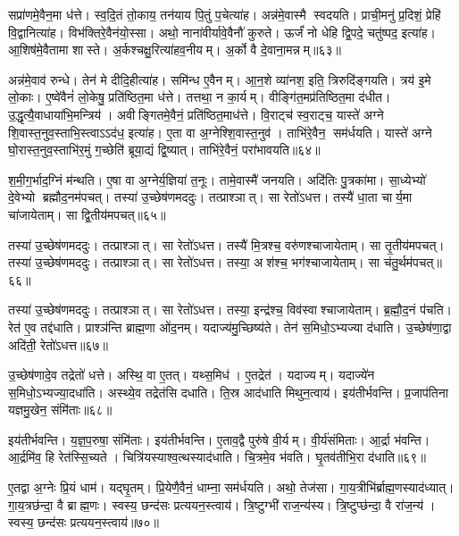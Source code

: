 सप्रा॑णमे॒वैन॒मा ध॑त्ते। स्व॒दि॒तं तो॒काय॒ तन॑याय पि॒तुं प॒चेत्या॑ह। अन्न॑मे॒वास्मै स्वदयति। प्राची॒मनु॑ प्र॒दिशं॒ प्रेहि॑ वि॒द्वानित्या॑ह। विभ॑क्तिरे॒वैन॑यो॒स्सा। अथो॒ नाना॑वीर्यावे॒वैनौ॑ कुरुते। ऊर्जं॑ नो धेहि द्वि॒पदे॒ चतु॑ष्पद॒ इत्या॑ह। आ॒शिष॑मे॒वैतामा शास्ते। अ॒र्कश्चक्षु॒रित्या॑हव॒नीयम्। अ॒र्को वै दे॒वाना॒मन्नम्॥६३॥

अन्न॑मे॒वाव॑ रुन्धे। तेन॑ मे दीदि॒हीत्या॑ह। समि॑न्ध ए॒वैनम्। आ॒न॒शे व्या॑नश॒ इति॒ त्रिरुदि॑ङ्गयति। त्रय॑ इ॒मे लो॒काः। ए॒ष्वे॑वैनं॑ लो॒केषु॒ प्रति॑ष्ठित॒मा ध॑त्ते। तत्तथा॒ न का॒र्यम्। वीङ्गि॑त॒मप्र॑तिष्ठित॒मा द॑धीत। उ॒द्धृत्यै॒वाधाया॑भि॒मन्त्रिय॑। अवीङ्गितमे॒वैनं॒ प्रति॑ष्ठित॒माध॑त्ते। वि॒राट्च॑ स्व॒राट्च॒ यास्ते॑ अग्ने शि॒वास्त॒नुव॒स्ताभि॒स्त्वाऽऽद॑ध॒ इत्या॑ह। ए॒ता वा अ॒ग्नेश्शि॒वास्त॒नुव॑। ताभि॑रे॒वैन॒ सम॑र्धयति। यास्ते॑ अग्ने घो॒रास्त॒नुव॒स्ताभि॑र॒मुं ग॒च्छेति॑ ब्रूया॒द्यं द्वि॒ष्यात्। ताभि॑रे॒वैनं॒ परा॑भावयति॥६४॥\anuvakamend[लो॒को॑ऽसृजतैन॒माध॑त्तेऽन्वाहार्य॒पच॑नं दे॒वाना॒मन्न॑मेनं॒ प्रति॑ष्ठित॒माध॑त्ते॒ पञ्च॑ च]

श॒मी॒ग॒र्भाद॒ग्निं म॑न्थति। ए॒षा वा अ॒ग्नेर्य॒ज्ञिया॑ त॒नूः। तामे॒वास्मै॑ जनयति। अदि॑तिः पु॒त्रका॑मा। सा॒ध्येभ्यो॑ दे॒वेभ्यो ब्रह्मौद॒नम॑पचत्। तस्या॑ उ॒च्छेष॑णमददुः। तत्प्राश्ञात्। सा रेतो॑ऽधत्त। तस्यै॑ धा॒ता चार्य॒मा चा॑जायेताम्। सा द्वि॒तीय॑मपचत्॥६५॥

तस्या॑ उ॒च्छेष॑णमददुः। तत्प्राश्ञात्। सा रेतो॑ऽधत्त। तस्यै॑ मि॒त्रश्च॒ वरु॑णश्चाजायेताम्। सा तृ॒तीय॑मपचत्। तस्या॑ उ॒च्छेष॑णमददुः। तत्प्राश्ञात्। सा रेतो॑ऽधत्त। तस्या॒ अश॑श्च॒ भग॑श्चाजायेताम्। सा च॑तु॒र्थम॑पचत्॥६६॥

तस्या॑ उ॒च्छेष॑णमददुः। तत्प्राश्ञात्। सा रेतो॑ऽधत्त। तस्या॒ इन्द्र॑श्च॒ विव॑स्वाश्चाजायेताम्। ब्र॒ह्मौ॒द॒नं प॑चति। रेत॑ ए॒व तद्द॑धाति। प्राश्ञ॑न्ति ब्राह्म॒णा ओ॑द॒नम्। यदाज्य॑मु॒च्छिष्य॑ते। तेन॑ स॒मिधो॒ऽभ्यज्या द॑धाति। उ॒च्छेष॑णा॒द्वा अदि॑ती॒ रेतो॑ऽधत्त॥६७॥

उ॒च्छेष॑णादे॒व तद्रेतो॑ धत्ते। अस्थि॒ वा ए॒तत्। यथ्स॒मिध॑। ए॒तद्रेत॑। यदाज्यम्। यदाज्ये॑न स॒मिधो॒ऽभ्यज्या॒दधा॑ति। अस्थ्ये॒व तद्रेत॑सि दधाति। ति॒स्र आद॑धाति मिथुन॒त्वाय॑। इय॑तीर्भवन्ति। प्र॒जाप॑तिना यज्ञमु॒खेन॒ संमि॑ताः॥६८॥

इय॑तीर्भवन्ति। य॒ज्ञ॒प॒रुषा॒ संमि॑ताः। इय॑तीर्भवन्ति। ए॒ताव॒द्वै पुरु॑षे वी॒र्यम्। वी॒र्य॑संमिताः। आ॒र्द्रा भ॑वन्ति। आ॒र्द्रमि॑व॒ हि रेत॑स्सि॒च्यते। चित्रि॑यस्याश्व॒त्थस्याद॑धाति। चि॒त्रमे॒व भ॑वति। घृ॒तव॑तीभि॒रा द॑धाति॥६९॥

ए॒तद्वा अ॒ग्नेः प्रि॒यं धाम॑। यद्घृ॒तम्। प्रि॒येणै॒वैनं॒ धाम्ना॒ सम॑र्धयति। अथो॒ तेज॑सा। गा॒य॒त्रीभि॑र्ब्राह्म॒णस्याद॑ध्यात्। गा॒य॒त्रछ॑न्दा॒ वै ब्राह्म॒णः। स्वस्य॒ छन्द॑सः प्रत्ययन॒स्त्वाय॑। त्रि॒ष्टुग्भी॑ राज॒न्य॑स्य। त्रि॒ष्टुप्छ॑न्दा॒ वै रा॑ज॒न्य॑। स्वस्य॒ छन्द॑सः प्रत्ययन॒स्त्वाय॑॥७०॥


